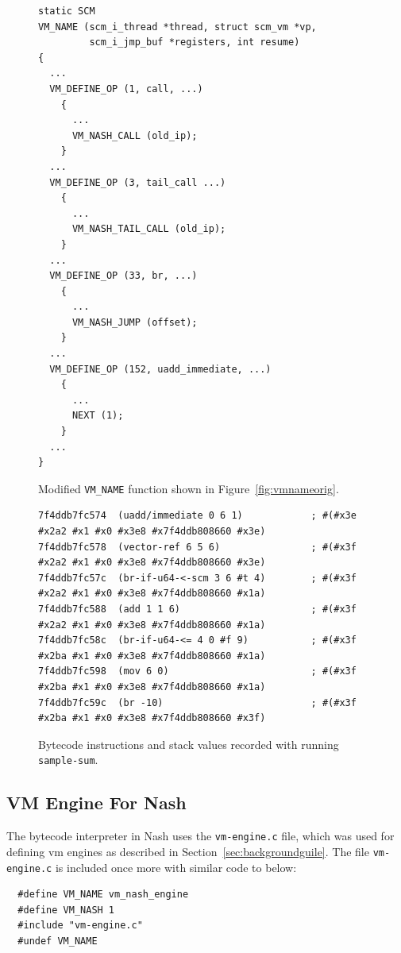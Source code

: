 \documentclass[preprint, 10pt]{sigplanconf}
\begin{document}
\begin{figure}
  \centering
  \small
\begin{verbatim}
static SCM
VM_NAME (scm_i_thread *thread, struct scm_vm *vp,
         scm_i_jmp_buf *registers, int resume)
{
  ...
  VM_DEFINE_OP (1, call, ...)
    {
      ...
      VM_NASH_CALL (old_ip);
    }
  ...
  VM_DEFINE_OP (3, tail_call ...)
    {
      ...
      VM_NASH_TAIL_CALL (old_ip);
    }
  ...
  VM_DEFINE_OP (33, br, ...)
    {
      ...
      VM_NASH_JUMP (offset);
    }
  ...
  VM_DEFINE_OP (152, uadd_immediate, ...)
    {
      ...
      NEXT (1);
    }
  ...
}
\end{verbatim}
\caption{Modified \texttt{VM\_NAME} function shown in
  Figure~\hyperref[fig:vmnameorig]{\ref{fig:vmnameorig}}.}
\label{fig:vmnamenash}
\end{figure}

\begin{figure}
  \centering
  \small
\begin{verbatim}
7f4ddb7fc574  (uadd/immediate 0 6 1)            ; #(#x3e #x2a2 #x1 #x0 #x3e8 #x7f4ddb808660 #x3e)
7f4ddb7fc578  (vector-ref 6 5 6)                ; #(#x3f #x2a2 #x1 #x0 #x3e8 #x7f4ddb808660 #x3e)
7f4ddb7fc57c  (br-if-u64-<-scm 3 6 #t 4)        ; #(#x3f #x2a2 #x1 #x0 #x3e8 #x7f4ddb808660 #x1a)
7f4ddb7fc588  (add 1 1 6)                       ; #(#x3f #x2a2 #x1 #x0 #x3e8 #x7f4ddb808660 #x1a)
7f4ddb7fc58c  (br-if-u64-<= 4 0 #f 9)           ; #(#x3f #x2ba #x1 #x0 #x3e8 #x7f4ddb808660 #x1a)
7f4ddb7fc598  (mov 6 0)                         ; #(#x3f #x2ba #x1 #x0 #x3e8 #x7f4ddb808660 #x1a)
7f4ddb7fc59c  (br -10)                          ; #(#x3f #x2ba #x1 #x0 #x3e8 #x7f4ddb808660 #x3f)
\end{verbatim}
\caption{Bytecode instructions and stack values recorded with running
  \texttt{sample-sum}.}
\label{fig:trace}
\end{figure}

\subsection{VM Engine For Nash}
The bytecode interpreter in Nash uses the \texttt{vm-engine.c} file, which was
used for defining vm engines as described in
Section~\hyperref[sec:background]{\ref{sec:backgroundguile}}.  The file
\texttt{vm-engine.c} is included once more with similar code to below:

\begin{verbatim}
  #define VM_NAME vm_nash_engine
  #define VM_NASH 1
  #include "vm-engine.c"
  #undef VM_NAME
\end{verbatim}
\end{document}
